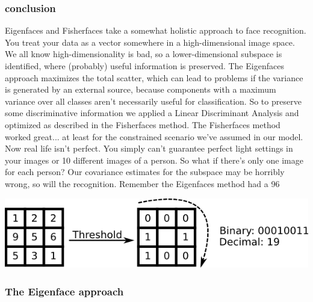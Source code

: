 \documentclass[a4paper,12pt]{report}
\begin{document}
\begin{itemize}
\begin{itemize}
\begin{itemize}
				\subsubsection{conclusion}
				Eigenfaces and Fisherfaces take a somewhat holistic approach to face recognition. You treat your data as a vector somewhere in a high-dimensional image space. We all know high-dimensionality is bad, so a lower-dimensional subspace is identified, where (probably) useful information is preserved. The Eigenfaces approach maximizes the total scatter, which can lead to problems if the variance is generated by an external source, because components with a maximum variance over all classes aren’t necessarily useful for classification. So to preserve some discriminative information we applied a Linear Discriminant Analysis and optimized as described in the Fisherfaces method. The Fisherfaces method worked great... at least for the constrained scenario we’ve assumed in our model.
				Now real life isn’t perfect. You simply can’t guarantee perfect light settings in your images or 10 different images of a person. So what if there’s only one image for each person? Our covariance estimates for the subspace may be horribly wrong, so will the recognition. Remember the Eigenfaces method had a 96%
				
			\includegraphics{pic2}
				\subsubsection{The Eigenface approach}
				

\end{itemize}
\end{itemize}
\end{itemize}
\end{document}
